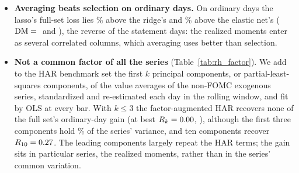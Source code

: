 \begin{itemize}
  gradient-boosted trees' ordinary-day loss by at most \rhchOrdLoOtherTreeMaxAbs\%, none significantly. The
  redundancy reading holds in all \rhchLinOrdNRedTest{} linear classes and in both gradient-boosted trees; it cannot
  be applied to the random forest, whose other removals were not run (its removal of the realized moments is on the
  design before the FOMC fix; Appendix~\ref{app:rh_channels}). The groups are largely correlated proxies of the
  volatility information that the futures' own moments measure most directly.
\item \textbf{Averaging beats selection on ordinary days.} On ordinary days the lasso's full-set loss lies
  \rhchLassoRidgeOrdPct\% above the ridge's and \rhchLassoEnetOrdPct\% above the elastic net's
  ($\mathrm{DM}={}$\rhchLassoRidgeOrdDm{} and \rhchLassoEnetOrdDm), the reverse of the statement days: the realized moments
  enter as several correlated columns, which averaging uses better than selection.
\item \textbf{Not a common factor of all the series} (Table~\ref{tab:rh_factor}). We add to the HAR benchmark set the
  first $k$ principal components, or partial-least-squares components, of the value averages of the \rhfaNSeries{}
  non-FOMC exogenous series, standardized and re-estimated each day in the rolling window, and fit by OLS at every bar.
  With $k \le 3$ the factor-augmented HAR recovers none of the full set's ordinary-day gain (at best
  $R_k = 0.00$, \rhfaBestSmall), although the first three components hold \rhfaShareCumThree\% of the
  series' variance, and ten components recover $R_{10} = 0.27$. The leading components largely repeat the
  HAR terms; the gain sits in particular series, the realized moments, rather than in the series' common variation.
\end{itemize}

